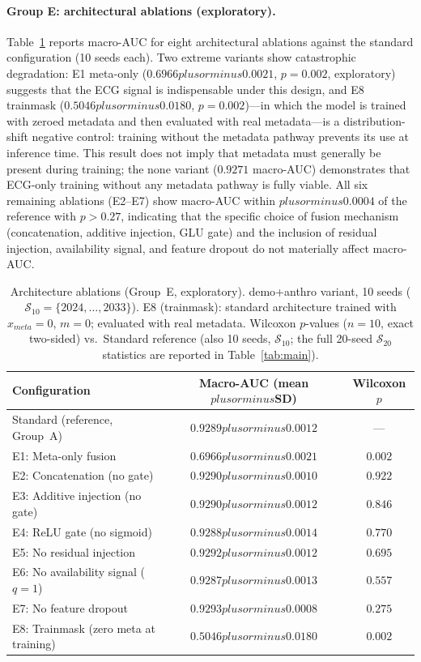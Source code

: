 \documentclass[mathematics,article,submit,pdftex]{Definitions/mdpi}
\def\texttt#1{#1}%
\def\mathrm#1{#1}%
\def\mathbf#1{#1}%
\def\textbf#1{#1}%
\def\pm{plus or minus }%
\begin{document}
\paragraph{Group E: architectural ablations (exploratory).}
Table~\ref{tab:group_e} reports macro-AUC for eight architectural ablations against the standard configuration (10 seeds each). Two extreme variants show catastrophic degradation: \textbf{E1 meta-only} ($0.6966{\pm}0.0021$, $p{=}0.002$, exploratory) suggests that the ECG signal is indispensable under this design, and \textbf{E8 trainmask} ($0.5046{\pm}0.0180$, $p{=}0.002$)---in which the model is trained with zeroed metadata and then evaluated with real metadata---is a distribution-shift negative control: training without the metadata pathway prevents its use at inference time. This result does not imply that metadata must generally be present during training; the \texttt{none} variant ($0.9271$ macro-AUC) demonstrates that ECG-only training without any metadata pathway is fully viable. All six remaining ablations (E2--E7) show macro-AUC within $\pm0.0004$ of the reference with $p{>}0.27$, indicating that the specific choice of fusion mechanism (concatenation, additive injection, GLU gate) and the inclusion of residual injection, availability signal, and feature dropout do not materially affect macro-AUC.

\begin{table}[H]
\caption{Architecture ablations (Group~E, exploratory). \texttt{demo+anthro} variant, 10 seeds ($\mathcal{S}_{10}{=}\{2024,\ldots,2033\}$). E8 (\texttt{trainmask}): standard architecture trained with $\mathbf{x}_{\mathrm{meta}}{=}\mathbf{0}$, $\mathbf{m}{=}\mathbf{0}$; evaluated with real metadata. Wilcoxon $p$-values ($n{=}10$, exact two-sided) vs.\ Standard reference (also 10 seeds, $\mathcal{S}_{10}$; the full 20-seed $\mathcal{S}_{20}$ statistics are reported in Table~\ref{tab:main}).}\label{tab:group_e}
\small\centering
\begin{tabular}{lcc}
\toprule
\textbf{Configuration} & \textbf{Macro-AUC (mean$\pm$SD)} & \textbf{Wilcoxon $p$} \\
\midrule
Standard (reference, Group~A) & $0.9289\pm0.0012$ & --- \\
E1: Meta-only fusion           & $0.6966\pm0.0021$ & $0.002$ \\
E2: Concatenation (no gate)    & $0.9290\pm0.0010$ & $0.922$ \\
E3: Additive injection (no gate) & $0.9290\pm0.0012$ & $0.846$ \\
E4: ReLU gate (no sigmoid)     & $0.9288\pm0.0014$ & $0.770$ \\
E5: No residual injection      & $0.9292\pm0.0012$ & $0.695$ \\
E6: No availability signal ($q{=}1$) & $0.9287\pm0.0013$ & $0.557$ \\
E7: No feature dropout         & $0.9293\pm0.0008$ & $0.275$ \\
E8: Trainmask (zero meta at training) & $0.5046\pm0.0180$ & $0.002$ \\
\bottomrule
\end{tabular}
\end{table}
\end{document}
